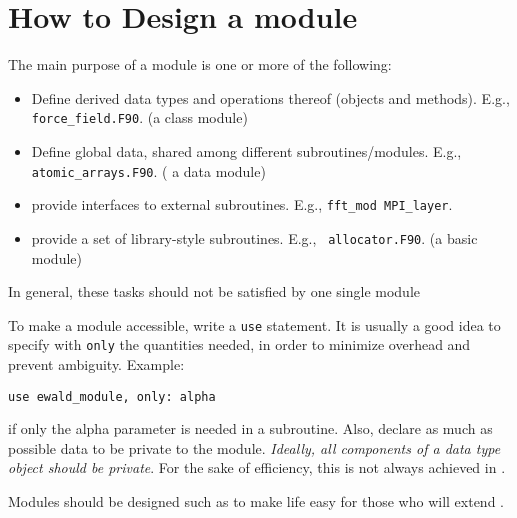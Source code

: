\section{How to Design a module}

The main purpose of a module is one or more of the following:

\begin{itemize}
\item Define derived data types and operations thereof (objects and
methods). E.g., {\tt force\_field.F90}. (a class module)
\item Define global data, shared among different
subroutines/modules. E.g., {\tt atomic\_arrays.F90}. ( a data module)
\item provide interfaces to external subroutines. E.g., {\tt fft\_mod MPI\_layer}. 
\item provide a set of library-style subroutines. E.g., {\tt
allocator.F90}. (a basic module)
\end{itemize}

In general, these tasks should not be satisfied by one single module

To make a module accessible, write a {\tt use} statement. It is
usually a good idea to specify with {\tt only} the quantities needed,
in order to minimize overhead and prevent ambiguity. Example:
\begin{verbatim}
use ewald_module, only: alpha
\end{verbatim}
if only the alpha parameter is needed in a subroutine. Also, declare
as much as possible data to be private to the module. {\em Ideally, all
components of a data type object should be private}. For the sake of
efficiency, this is not always achieved in \PR.

Modules should be designed such as to make life easy for those who
will extend \PR.

